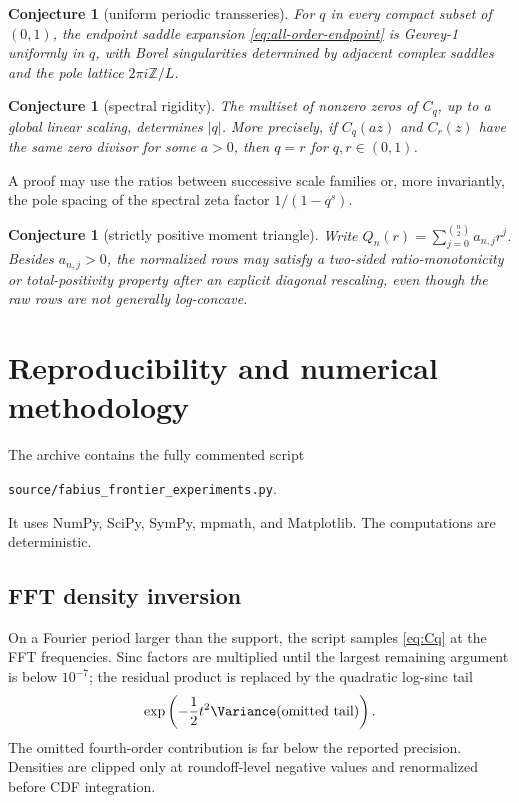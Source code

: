 \documentclass[11pt]{article}
\newtheorem{conjecture}[theorem]{Conjecture}
\theoremstyle{definition}
\theoremstyle{remark}
\begin{document}
\begin{conjecture}[uniform periodic transseries]\label{conj:uniform-transseries}
For $q$ in every compact subset of $(0,1)$, the endpoint saddle expansion \cref{eq:all-order-endpoint} is Gevrey-1 uniformly in $q$, with Borel singularities determined by adjacent complex saddles and the pole lattice $2\pi i\mathbb Z/L$.
\end{conjecture}

\begin{conjecture}[spectral rigidity]\label{conj:spectral-rigidity}
The multiset of nonzero zeros of $C_q$, up to a global linear scaling, determines $|q|$.  More precisely, if $C_q(az)$ and $C_r(z)$ have the same zero divisor for some $a>0$, then $q=r$ for $q,r\in(0,1)$.
\end{conjecture}

A proof may use the ratios between successive scale families or, more invariantly, the pole spacing of the spectral zeta factor $1/(1-q^s)$.

\begin{conjecture}[strictly positive moment triangle]\label{conj:moment-triangle}
Write $Q_n(r)=\sum_{j=0}^{\binom n2}a_{n,j}r^j$.  Besides $a_{n,j}>0$, the normalized rows may satisfy a two-sided ratio-monotonicity or total-positivity property after an explicit diagonal rescaling, even though the raw rows are not generally log-concave.
\end{conjecture}

\section{Reproducibility and numerical methodology}

The archive contains the fully commented script
\begin{center}
\texttt{source/fabius\_frontier\_experiments.py}.
\end{center}
It uses NumPy, SciPy, SymPy, mpmath, and Matplotlib.  The computations are deterministic.

\subsection{FFT density inversion}

On a Fourier period larger than the support, the script samples \cref{eq:Cq} at the FFT frequencies.  Sinc factors are multiplied until the largest remaining argument is below $10^{-7}$; the residual product is replaced by the quadratic log-sinc tail
\[
 \exp\left(-\frac12t^2\Variance(\text{omitted tail})\right).
\]
The omitted fourth-order contribution is far below the reported precision.  Densities are clipped only at roundoff-level negative values and renormalized before CDF integration.
\end{document}
